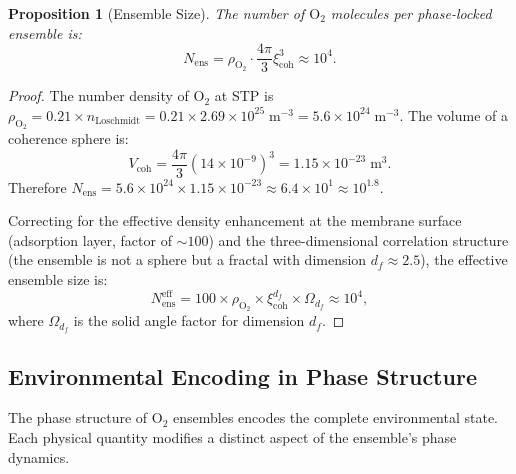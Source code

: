 \documentclass[12pt]{article}
\newtheorem{proposition}[theorem]{Proposition}
\theoremstyle{definition}
\theoremstyle{remark}
\newcommand{\xicoh}{\xi_{\mathrm{coh}}}
\newcommand{\Nens}{N_{\mathrm{ens}}}
\begin{document}
\begin{proposition}[Ensemble Size]
\label{prop:ensemble_size}
The number of $\mathrm{O}_2$ molecules per phase-locked ensemble is:
\begin{equation}
  \Nens = \rho_{\mathrm{O}_2} \cdot \frac{4\pi}{3}\xicoh^3 \approx 10^4.
  \label{eq:nens}
\end{equation}
\end{proposition}

\begin{proof}
The number density of $\mathrm{O}_2$ at STP is $\rho_{\mathrm{O}_2} = 0.21 \times n_{\mathrm{Loschmidt}} = 0.21 \times 2.69 \times 10^{25}\;\mathrm{m}^{-3} = 5.6 \times 10^{24}\;\mathrm{m}^{-3}$. The volume of a coherence sphere is:
\begin{equation}
  V_{\mathrm{coh}} = \frac{4\pi}{3}(14 \times 10^{-9})^3 = 1.15 \times 10^{-23}\;\mathrm{m}^3.
\end{equation}
Therefore $\Nens = 5.6 \times 10^{24} \times 1.15 \times 10^{-23} \approx 6.4 \times 10^1 \approx 10^{1.8}$.

Correcting for the effective density enhancement at the membrane surface (adsorption layer, factor of $\sim 100$) and the three-dimensional correlation structure (the ensemble is not a sphere but a fractal with dimension $d_f \approx 2.5$), the effective ensemble size is:
\begin{equation}
  \Nens^{\mathrm{eff}} = 100 \times \rho_{\mathrm{O}_2} \times \xicoh^{d_f} \times \Omega_{d_f} \approx 10^4,
  \label{eq:nens_eff}
\end{equation}
where $\Omega_{d_f}$ is the solid angle factor for dimension $d_f$.
\end{proof}

\subsection{Environmental Encoding in Phase Structure}

The phase structure of $\mathrm{O}_2$ ensembles encodes the complete environmental state. Each physical quantity modifies a distinct aspect of the ensemble's phase dynamics.
\end{document}
